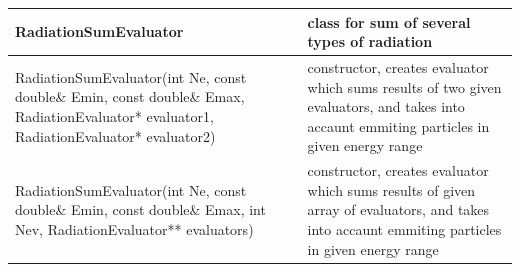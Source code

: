 \begin{small}
\begin{xtabular}{|p{0.51\textwidth}|p{0.49\textwidth}|}
		\hline
		\textbf{RadiationSumEvaluator} & class for sum of several types of radiation\\
		\hline
		RadiationSumEvaluator(int Ne, const double\& Emin, const double\& Emax, RadiationEvaluator* evaluator1, RadiationEvaluator* evaluator2) & constructor, creates evaluator which sums results of two given evaluators, and takes into accaunt emmiting particles in given energy range\\
		\hline
		RadiationSumEvaluator(int Ne, const double\& Emin, const double\& Emax, int Nev, RadiationEvaluator** evaluators) & constructor, creates evaluator which sums results of given array of evaluators, and takes into accaunt emmiting particles in given energy range\\
		\hline
	\end{xtabular}
\end{small}

